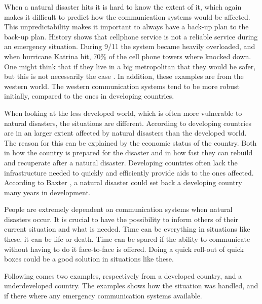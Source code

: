 When a natural disaster hits it is hard to know the extent of it, which  again makes it difficult to predict how the communication systems would be affected. This unpredictability makes it important to always have a back-up plan to the back-up plan. History shows that cellphone service is not a reliable service during an emergency situation. During 9/11 the system became heavily overloaded, and when hurricane Katrina hit, 70\% of the cell phone towers where knocked down. One might think that if they live in a big metropolitan that they would be safer, but this is not necessarily the case \cite{disasterComm}. In addition, these examples are from the western world. The western communication systems tend to be more robust initially, compared to the ones in developing countries. 

When looking at the less developed world, which is often more vulnerable to natural disasters, the situations are different. According to \cite{DevelopingWorld, 360} developing countries are in an larger extent affected by natural disasters than the developed world. The reason for this can be explained by the economic status of the country. Both in how the country is prepared for the disaster and in how fast they can rebuild and recuperate after a natural disaster. Developing countries often lack the infrastructure needed to quickly and efficiently provide aids to the ones affected. According to Baxter \cite{360}, a natural disaster could set back a developing country many years in development.  

People are extremely dependent on communication systems when natural disasters occur. It is crucial to have the possibility to inform others of their current situation and what is needed. Time can be everything in situations like these, it can be life or death. Time can be spared if the ability to communicate without having to do it face-to-face is offered. Doing a quick roll-out of \gls{quick} boxes could be a good solution in situations like these. 

Following comes two examples, respectively from a developed country, and a underdeveloped country. The examples shows how the situation was handled, and if there where any emergency communication systems available. 


